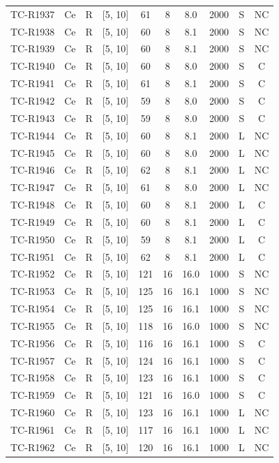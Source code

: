 \begin{longtable}{lccccccccc}
TC-R1937 & Ce & R & [5, 10] & 61 & 8 & 8.0 & 2000 & S & NC \\
TC-R1938 & Ce & R & [5, 10] & 60 & 8 & 8.1 & 2000 & S & NC \\
TC-R1939 & Ce & R & [5, 10] & 60 & 8 & 8.1 & 2000 & S & NC \\
TC-R1940 & Ce & R & [5, 10] & 60 & 8 & 8.0 & 2000 & S & C \\
TC-R1941 & Ce & R & [5, 10] & 61 & 8 & 8.1 & 2000 & S & C \\
TC-R1942 & Ce & R & [5, 10] & 59 & 8 & 8.0 & 2000 & S & C \\
TC-R1943 & Ce & R & [5, 10] & 59 & 8 & 8.0 & 2000 & S & C \\
TC-R1944 & Ce & R & [5, 10] & 60 & 8 & 8.1 & 2000 & L & NC \\
TC-R1945 & Ce & R & [5, 10] & 60 & 8 & 8.0 & 2000 & L & NC \\
TC-R1946 & Ce & R & [5, 10] & 62 & 8 & 8.1 & 2000 & L & NC \\
TC-R1947 & Ce & R & [5, 10] & 61 & 8 & 8.0 & 2000 & L & NC \\
TC-R1948 & Ce & R & [5, 10] & 60 & 8 & 8.1 & 2000 & L & C \\
TC-R1949 & Ce & R & [5, 10] & 60 & 8 & 8.1 & 2000 & L & C \\
TC-R1950 & Ce & R & [5, 10] & 59 & 8 & 8.1 & 2000 & L & C \\
TC-R1951 & Ce & R & [5, 10] & 62 & 8 & 8.1 & 2000 & L & C \\
TC-R1952 & Ce & R & [5, 10] & 121 & 16 & 16.0 & 1000 & S & NC \\
TC-R1953 & Ce & R & [5, 10] & 125 & 16 & 16.1 & 1000 & S & NC \\
TC-R1954 & Ce & R & [5, 10] & 125 & 16 & 16.1 & 1000 & S & NC \\
TC-R1955 & Ce & R & [5, 10] & 118 & 16 & 16.0 & 1000 & S & NC \\
TC-R1956 & Ce & R & [5, 10] & 116 & 16 & 16.1 & 1000 & S & C \\
TC-R1957 & Ce & R & [5, 10] & 124 & 16 & 16.1 & 1000 & S & C \\
TC-R1958 & Ce & R & [5, 10] & 123 & 16 & 16.1 & 1000 & S & C \\
TC-R1959 & Ce & R & [5, 10] & 121 & 16 & 16.0 & 1000 & S & C \\
TC-R1960 & Ce & R & [5, 10] & 123 & 16 & 16.1 & 1000 & L & NC \\
TC-R1961 & Ce & R & [5, 10] & 117 & 16 & 16.1 & 1000 & L & NC \\
TC-R1962 & Ce & R & [5, 10] & 120 & 16 & 16.1 & 1000 & L & NC \\

\end{longtable}
